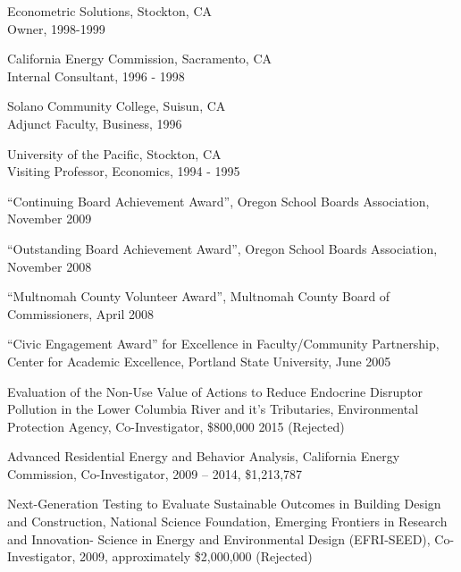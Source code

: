 \documentclass[Computer Science]{vita}
\begin{document}
\begin{vita}
\begin{Experience}
  \item Econometric Solutions, Stockton, CA\\
    Owner, 1998-1999
		
  \item California Energy Commission, Sacramento, CA\\
    Internal Consultant, 1996 - 1998
	
  \item Solano Community College, Suisun, CA\\
    Adjunct Faculty, Business, 1996
		
  \item University of the Pacific, Stockton, CA\\
    Visiting Professor, Economics, 1994 - 1995

  \end{Experience}

  \begin{Honors}

  \item ``Continuing Board Achievement Award'', Oregon School Boards Association, November 2009

\item ``Outstanding Board Achievement Award'', Oregon School Boards Association, November 2008

\item ``Multnomah County Volunteer Award'', Multnomah County Board of Commissioners, April 2008

  \item ``Civic Engagement Award'' for Excellence in Faculty/Community
    Partnership, Center for Academic Excellence, Portland State
    University, June 2005

  \end{Honors}

  \begin{Grants and Sponsored Research}
\item Evaluation of the Non-Use Value of Actions to Reduce Endocrine Disruptor Pollution in the Lower Columbia River and it's Tributaries, Environmental Protection Agency, Co-Investigator, \$800,000 2015 (Rejected)

\item Advanced Residential Energy and Behavior Analysis, California Energy Commission, Co-Investigator, 2009 -- 2014, \$1,213,787
  
\item Next-Generation Testing to Evaluate Sustainable Outcomes in Building Design and Construction, National Science Foundation, Emerging Frontiers in Research and Innovation- Science in Energy and Environmental Design (EFRI-SEED), Co-Investigator, 2009, approximately \$2,000,000 (Rejected)


\end{Grants and Sponsored Research}
\end{vita}
\end{document}
